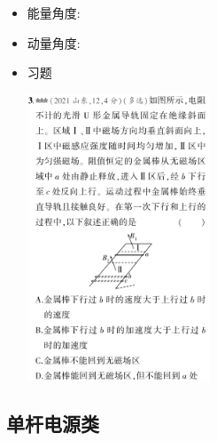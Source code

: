 \documentclass{article}
\begin{document}
\begin{itemize}
    \item 能量角度:
          \vspace{5em}
    \item 动量角度:
          \vspace{5em}
    \item 习题

          \centering
          \includegraphics[width = 0.43\textwidth]{./pictures/18.png}

\end{itemize}

\vspace{2em}

\subsection{单杆电源类}
\end{document}
